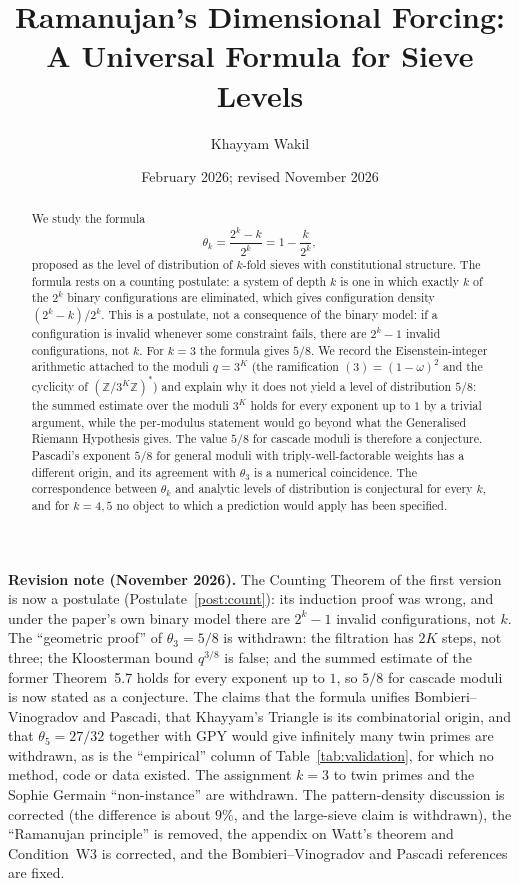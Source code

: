 \documentclass[12pt]{amsart}
\title[Ramanujan's Dimensional Forcing]{Ramanujan's Dimensional Forcing:
  A Universal Formula for Sieve Levels}
\author{Khayyam Wakil}
\date{February 2026; revised November 2026}
\theoremstyle{plain}
\theoremstyle{definition}
\theoremstyle{remark}
\newcommand{\Z}{\mathbb{Z}}
\newcommand{\thetak}{\theta_k}
\begin{document}
\begin{abstract}
We study the formula
\[
  \thetak = \frac{2^k - k}{2^k} = 1 - \frac{k}{2^k},
\]
proposed as the level of distribution of $k$-fold sieves with constitutional
structure. The formula rests on a counting postulate: a system of depth $k$ is
one in which exactly $k$ of the $2^k$ binary configurations are eliminated,
which gives configuration density $(2^k-k)/2^k$. This is a postulate, not a
consequence of the binary model: if a configuration is invalid whenever some
constraint fails, there are $2^k-1$ invalid configurations, not $k$. For $k=3$
the formula gives $5/8$. We record the Eisenstein-integer arithmetic attached to
the moduli $q = 3^K$ (the ramification $(3) = (1-\omega)^2$ and the cyclicity of
$(\Z/3^K\Z)^*$) and explain why it does not yield a level of distribution $5/8$:
the summed estimate over the moduli $3^K$ holds for every exponent up to $1$ by
a trivial argument, while the per-modulus statement would go beyond what the
Generalised Riemann Hypothesis gives. The value $5/8$ for cascade moduli is
therefore a conjecture. Pascadi's exponent $5/8$ for general moduli with
triply-well-factorable weights has a different origin, and its agreement with
$\theta_3$ is a numerical coincidence. The correspondence between $\thetak$ and
analytic levels of distribution is conjectural for every $k$, and for $k = 4, 5$
no object to which a prediction would apply has been specified.
\end{abstract}

\maketitle

\noindent\textbf{Revision note (November 2026).}
The Counting Theorem of the first version is now a postulate
(Postulate~\ref{post:count}): its induction proof was wrong, and under the
paper's own binary model there are $2^k-1$ invalid configurations, not $k$.
The ``geometric proof'' of $\theta_3 = 5/8$ is withdrawn: the filtration has
$2K$ steps, not three; the Kloosterman bound $q^{3/8}$ is false; and the summed
estimate of the former Theorem~5.7 holds for every exponent up to $1$, so $5/8$
for cascade moduli is now stated as a conjecture. The claims that the formula
unifies Bombieri--Vinogradov and Pascadi, that Khayyam's Triangle is its
combinatorial origin, and that $\theta_5 = 27/32$ together with GPY would give
infinitely many twin primes are withdrawn, as is the ``empirical'' column of
Table~\ref{tab:validation}, for which no method, code or data existed. The
assignment $k=3$ to twin primes and the Sophie Germain ``non-instance'' are
withdrawn. The pattern-density discussion is corrected (the difference is about
$9\%$, and the large-sieve claim is withdrawn), the ``Ramanujan principle'' is
removed, the appendix on Watt's theorem and Condition~W3 is corrected, and the
Bombieri--Vinogradov and Pascadi references are fixed.
\end{document}
